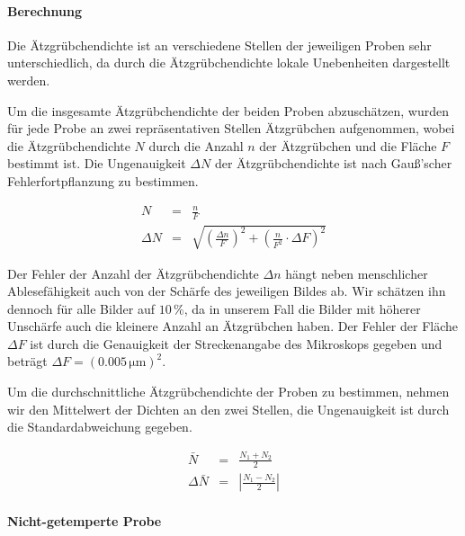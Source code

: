 \documentclass[12pt,a4paper]{scrartcl}
\numberwithin{equation}{section} %
\renewcommand{\[}{} %
\renewcommand{\]}{\noindent} %
\begin{document}
\hypertarget{berechnung}{%
\paragraph{Berechnung}\label{berechnung}}

Die Ätzgrübchendichte ist an verschiedene Stellen der jeweiligen Proben
sehr unterschiedlich, da durch die Ätzgrübchendichte lokale Unebenheiten
dargestellt werden.

Um die insgesamte Ätzgrübchendichte der beiden Proben abzuschätzen,
wurden für jede Probe an zwei repräsentativen Stellen Ätzgrübchen
aufgenommen, wobei die Ätzgrübchendichte \(N\) durch die Anzahl \(n\)
der Ätzgrübchen und die Fläche \(F\) bestimmt ist. Die Ungenauigkeit
\(\Delta N\) der Ätzgrübchendichte ist nach Gauß'scher
Fehlerfortpflanzung zu bestimmen.

\[
\begin{eqnarray}
    N &=& \frac{n}{F} \label{N}\\
    \Delta N &=& \sqrt{
        \left(\frac{\Delta n}{F}\right)^2
        + \left(\frac{n}{F^2} \cdot \Delta F\right)^2} \label{DeltaN}
\end{eqnarray}
\]

Der Fehler der Anzahl der Ätzgrübchendichte \(\Delta n\) hängt neben
menschlicher Ablesefähigkeit auch von der Schärfe des jeweiligen Bildes
ab. Wir schätzen ihn dennoch für alle Bilder auf \(10\,\%\), da in
unserem Fall die Bilder mit höherer Unschärfe auch die kleinere Anzahl
an Ätzgrübchen haben. Der Fehler der Fläche \(\Delta F\) ist durch die
Genauigkeit der Streckenangabe des Mikroskops gegeben und beträgt
\(\Delta F=(0.005 \mathrm{\, \mu m})^2\).

Um die durchschnittliche Ätzgrübchendichte der Proben zu bestimmen,
nehmen wir den Mittelwert der Dichten an den zwei Stellen, die
Ungenauigkeit ist durch die Standardabweichung gegeben.

\[
\begin{eqnarray}
    \bar{N} &=& \frac{N_1 + N_2}{2} \label{Nbar}\\
    \Delta \bar N &=& \left| \frac{N_1 - N_2}{2} \right| \label{DeltaNbar}
\end{eqnarray}
\]

\hypertarget{nicht-getemperte-probe}{%
\paragraph{Nicht-getemperte Probe}\label{nicht-getemperte-probe}}
\end{document}
